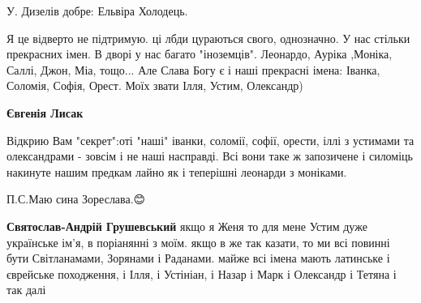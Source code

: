 \begin{itemize}
 
У. Дизелів добре: Ельвіра Холодець.

 

Я це відверто не підтримую. ці лбди цураються свого, однозначно. У нас стільки
прекрасних імен. В дворі у нас багато "іноземців". Леонардо, Ауріка
,Моніка, Саллі, Джон, Міа, тощо... Але Слава Богу є і наші прекрасні імена:
Іванка, Соломія, Софія, Орест. Моїх звати Ілля, Устим, Олександр)

\begin{itemize}
 
\textbf{Євгенія Лисак} 

Відкрию Вам "секрет":оті "наші" іванки, соломії, софії, орести, іллі з устимами та
олександрами - зовсім і не наші насправді. Всі вони таке ж запозичене і силоміць
накинуте нашим предкам лайно як і теперішні леонарди з моніками.🤣🤣🤣

П.С.Маю сина Зореслава.😊


 
\textbf{Святослав-Андрій Грушевський} якщо я Женя то для мене Устим дуже
українське ім'я, в поріанянні з моїм. якщо в же так казати, то ми всі повинні
бути Світланамами, Зорянами і Раданами. майже всі імена мають латинське і
єврейське походження, і Ілля, і Устініан, і Назар і Марк і Олександр і Тетяна і
так далі

 

\end{itemize}
\end{itemize}

